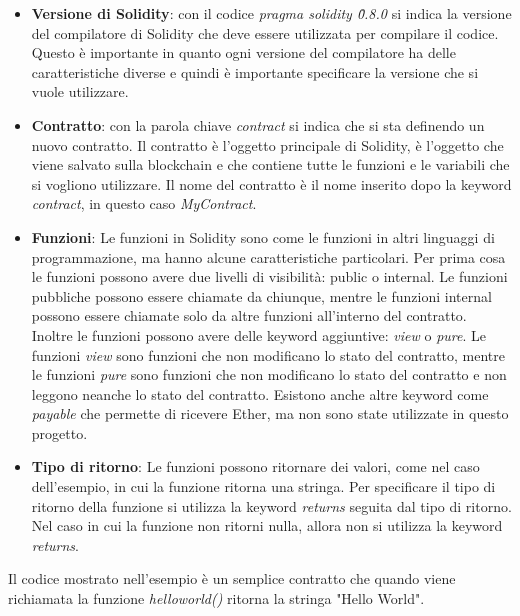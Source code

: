 \begin{itemize}
    \item \textbf{Versione di Solidity}: con il codice \textit{pragma solidity
        \^0.8.0} si indica la versione del compilatore di Solidity che deve
        essere utilizzata per compilare il codice. Questo è importante in
        quanto ogni versione del compilatore ha delle caratteristiche diverse
        e quindi è importante specificare la versione che si vuole utilizzare.
    \item \textbf{Contratto}: con la parola chiave \textit{contract} si indica
        che si sta definendo un nuovo contratto. Il contratto è l'oggetto
        principale di Solidity, è l'oggetto che viene salvato sulla blockchain
        e che contiene tutte le funzioni e le variabili che si vogliono
        utilizzare. Il nome del contratto è il nome inserito dopo la keyword
        \textit{contract}, in questo caso \textit{MyContract}.
    \item \textbf{Funzioni}: Le funzioni in Solidity sono come le funzioni in
        altri linguaggi di programmazione, ma hanno alcune caratteristiche
        particolari. Per prima cosa le funzioni possono avere due livelli di
        visibilità: public o internal. Le funzioni pubbliche possono essere
        chiamate da chiunque, mentre le funzioni internal possono essere
        chiamate solo da altre funzioni all'interno del contratto. Inoltre le
        funzioni possono avere delle keyword aggiuntive: \textit{view} o
        \textit{pure}. Le funzioni \textit{view} sono funzioni che non
        modificano lo stato del contratto, mentre le funzioni \textit{pure}
        sono funzioni che non modificano lo stato del contratto e non leggono
        neanche lo stato del contratto. Esistono anche altre keyword come 
        \textit{payable} che permette di ricevere Ether, ma non sono state
        utilizzate in questo progetto.
    \item \textbf{Tipo di ritorno}: Le funzioni possono ritornare dei valori,
        come nel caso dell'esempio, in cui la funzione ritorna una stringa. Per
        specificare il tipo di ritorno della funzione si utilizza la keyword
        \textit{returns} seguita dal tipo di ritorno. Nel caso in cui la
        funzione non ritorni nulla, allora non si utilizza la keyword
        \textit{returns}.
\end{itemize}

Il codice mostrato nell'esempio è un semplice contratto che quando viene 
richiamata la funzione \textit{helloworld()} ritorna la stringa "Hello World".

